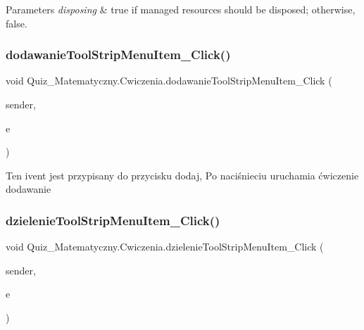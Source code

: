 \begin{DoxyParams}{Parameters}
{\em disposing} & true if managed resources should be disposed; otherwise, false.\\
\hline
\end{DoxyParams}
\mbox{\label{class_quiz___matematyczny_1_1_cwiczenia_adb1ca88621f54493b5101676d51a10bd}} 
\subsubsection{\texorpdfstring{dodawanieToolStripMenuItem\_Click()}{dodawanieToolStripMenuItem\_Click()}}
{\footnotesize\ttfamily void Quiz\+\_\+\+Matematyczny.\+Cwiczenia.\+dodawanie\+Tool\+Strip\+Menu\+Item\+\_\+\+Click (\begin{DoxyParamCaption}\item[{object}]{sender,  }\item[{Event\+Args}]{e }\end{DoxyParamCaption})\hspace{0.3cm}{\ttfamily [private]}}

Ten ivent jest przypisany do przycisku dodaj, Po naciśnieciu uruchamia ćwiczenie dodawanie \mbox{\label{class_quiz___matematyczny_1_1_cwiczenia_a67304a79ffbff4b960a2a0ac80a485c8}} 
\subsubsection{\texorpdfstring{dzielenieToolStripMenuItem\_Click()}{dzielenieToolStripMenuItem\_Click()}}
{\footnotesize\ttfamily void Quiz\+\_\+\+Matematyczny.\+Cwiczenia.\+dzielenie\+Tool\+Strip\+Menu\+Item\+\_\+\+Click (\begin{DoxyParamCaption}\item[{object}]{sender,  }\item[{Event\+Args}]{e }\end{DoxyParamCaption})\hspace{0.3cm}{\ttfamily [private]}}


